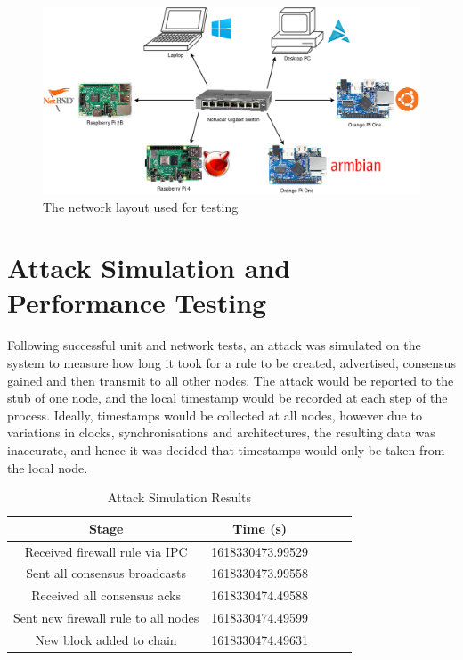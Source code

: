 \documentclass[a4paper, 11pt]{report}
\begin{document}
\begin{figure}[H]
\centering
\includegraphics[width=\textwidth,keepaspectratio]{networkmap}
\caption{The network layout used for testing} 
\label{fig:networkmap}
\end{figure}


\section{Attack Simulation and Performance Testing} \label{simu}
Following successful unit and network tests, an attack was simulated on the system to measure how long it took for a rule to be created, advertised, consensus gained and then transmit to all other nodes. The attack would be reported to the \gls{stub} of one node, and the local timestamp would be recorded at each step of the process. Ideally, timestamps would be collected at all nodes, however due to variations in clocks, synchronisations and architectures, the resulting data was inaccurate, and hence it was decided that timestamps would only be taken from the local node.

\begin{table}[H]
\centering
\begin{tabular}{ |c|c|c|c|c| } 
\hline
Stage & Time (s)\\
\hline
Received firewall rule via IPC & 1618330473.99529\\
Sent all consensus broadcasts & 1618330473.99558\\
Received all consensus acks & 1618330474.49588\\
Sent new firewall rule to all nodes & 1618330474.49599\\
New block added to chain & 1618330474.49631\\
\hline
\end{tabular}
\caption{Attack Simulation Results}
\label{tab:attack}
\end{table}
\end{document}
